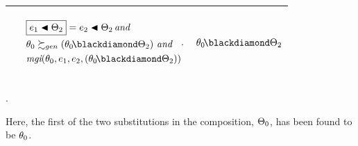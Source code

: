 \documentclass[runningheads]{llncs}
\DeclareMathOperator{\uand}{\emph{and}\,}
\DeclareMathOperator{\mgi}{\emph{mgi}}
\begin{document}
\begin{center}
\begin{tabular}{|m{}|m{}||m{}|}
 \hline 
  &\begin{center} 
$
\begin{aligned}
&\begin{aligned}&\boxed{\e{1} \apply \Thet{2}} = \e{2} \apply \Thet{2} \uand \end{aligned}   \\
 \,\, & \thet{0} \moregen (\thet{0}\! \compose \Thet{2}) \, \uand
\\
  \,\, & {\mgi}(\thet{0}, \e{1}, \e{2}, (\thet{0}\! \compose \Thet{2}))
\end{aligned}.$
\end{center}
& 
\begin{center}$\thet{0}\! \compose \Thet{2}$ \end{center}\\
\hline
\end{tabular}.
\end{center}
 Here, the first of the two substitutions in the composition, $\Theta_{0}$, has been found to be $\theta_{0}$.
\end{document}
